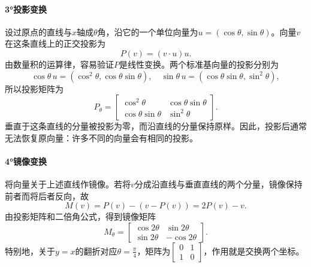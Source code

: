 \paragraph{3°投影变换} \mbox{}

设过原点的直线与\(x\)轴成\(\theta\)角，沿它的一个单位向量为\(u = \left( \cos \theta , \sin \theta \right)\)。向量\(v\)在这条直线上的正交投影为
\begin{equation}
    P \left( v \right) = \left( v \cdot u \right) u .
\end{equation}
由数量积的运算律，容易验证\(P\)是线性变换。两个标准基向量的投影分别为
\begin{equation}
    \cos \theta \, u = \left( \cos^{2} \theta , \cos \theta \sin \theta \right) ,
    \quad
    \sin \theta \, u = \left( \cos \theta \sin \theta , \sin^{2} \theta \right) ,
\end{equation}
所以投影矩阵为
\begin{equation}
    P_{\theta} = \left[ \begin{matrix}
        \cos^{2} \theta & \cos \theta \sin \theta \\
        \cos \theta \sin \theta & \sin^{2} \theta
    \end{matrix} \right] .
\end{equation}
垂直于这条直线的分量被投影为零，而沿直线的分量保持原样。因此，投影后通常无法恢复原向量：许多不同的向量会有相同的投影。

\paragraph{4°镜像变换} \mbox{}

将向量关于上述直线作镜像。若将\(v\)分成沿直线与垂直直线的两个分量，镜像保持前者而将后者反向，故
\begin{equation}
    M \left( v \right) = P \left( v \right) - \left( v - P \left( v \right) \right)
    = 2 P \left( v \right) - v .
\end{equation}
由投影矩阵和二倍角公式，得到镜像矩阵
\begin{equation}
    M_{\theta} = \left[ \begin{matrix}
        \cos 2 \theta & \sin 2 \theta \\
        \sin 2 \theta & - \cos 2 \theta
    \end{matrix} \right] .
\end{equation}
特别地，关于\(y = x\)的翻折对应\(\theta = \frac{\pi}{4}\)，矩阵为\(\left[ \begin{matrix}0 & 1 \\ 1 & 0\end{matrix} \right]\)，作用就是交换两个坐标。

